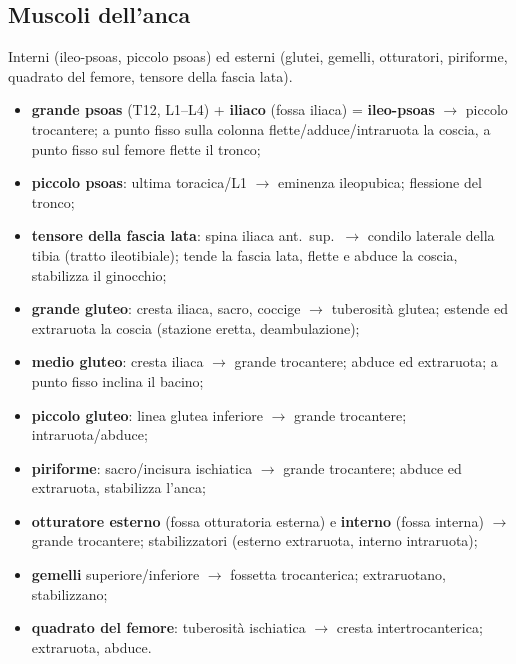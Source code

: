 \subsection{Muscoli dell'anca}
Interni (ileo-psoas, piccolo psoas) ed esterni (glutei, gemelli, otturatori, piriforme, quadrato del
femore, tensore della fascia lata).
\begin{itemize}
  \item \textbf{grande psoas} (T12, L1--L4) + \textbf{iliaco} (fossa iliaca) = \textbf{ileo-psoas}
    $\rightarrow$ piccolo trocantere; a punto fisso sulla colonna flette/adduce/intraruota la coscia,
    a punto fisso sul femore flette il tronco;
  \item \textbf{piccolo psoas}: ultima toracica/L1 $\rightarrow$ eminenza ileopubica; flessione del
    tronco;
  \item \textbf{tensore della fascia lata}: spina iliaca ant.\ sup.\ $\rightarrow$ condilo laterale
    della tibia (tratto ileotibiale); tende la fascia lata, flette e abduce la coscia, stabilizza il
    ginocchio;
  \item \textbf{grande gluteo}: cresta iliaca, sacro, coccige $\rightarrow$ tuberosità glutea;
    estende ed extraruota la coscia (stazione eretta, deambulazione);
  \item \textbf{medio gluteo}: cresta iliaca $\rightarrow$ grande trocantere; abduce ed extraruota;
    a punto fisso inclina il bacino;
  \item \textbf{piccolo gluteo}: linea glutea inferiore $\rightarrow$ grande trocantere;
    intraruota/abduce;
  \item \textbf{piriforme}: sacro/incisura ischiatica $\rightarrow$ grande trocantere; abduce ed
    extraruota, stabilizza l'anca;
  \item \textbf{otturatore esterno} (fossa otturatoria esterna) e \textbf{interno} (fossa interna)
    $\rightarrow$ grande trocantere; stabilizzatori (esterno extraruota, interno intraruota);
  \item \textbf{gemelli} superiore/inferiore $\rightarrow$ fossetta trocanterica; extraruotano,
    stabilizzano;
  \item \textbf{quadrato del femore}: tuberosità ischiatica $\rightarrow$ cresta intertrocanterica;
    extraruota, abduce.
\end{itemize}

